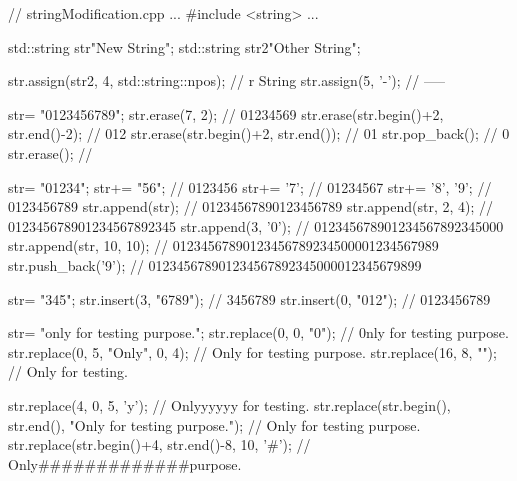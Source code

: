 
\begin{cpp}
// stringModification.cpp
...
#include <string>
...

std::string str{"New String"};
std::string str2{"Other String"};

str.assign(str2, 4, std::string::npos); // r String
str.assign(5, '-'); // -----

str= {"0123456789"};
str.erase(7, 2); // 01234569
str.erase(str.begin()+2, str.end()-2); // 012
str.erase(str.begin()+2, str.end()); // 01
str.pop_back(); // 0
str.erase(); //

str= "01234";
str+= "56"; // 0123456
str+= '7'; // 01234567
str+= {'8', '9'}; // 0123456789
str.append(str); // 01234567890123456789
str.append(str, 2, 4); // 012345678901234567892345
str.append(3, '0'); // 012345678901234567892345000
str.append(str, 10, 10); // 01234567890123456789234500001234567989
str.push_back('9'); // 012345678901234567892345000012345679899

str= {"345"};
str.insert(3, "6789"); // 3456789
str.insert(0, "012"); // 0123456789

str= {"only for testing purpose."};
str.replace(0, 0, "0"); // 0nly for testing purpose.
str.replace(0, 5, "Only", 0, 4); // Only for testing purpose.
str.replace(16, 8, ""); // Only for testing.

str.replace(4, 0, 5, 'y'); // Onlyyyyyy for testing.
str.replace(str.begin(), str.end(), "Only for testing purpose.");
										// Only for testing purpose.
str.replace(str.begin()+4, str.end()-8, 10, '#');
										// Only#############purpose.
\end{cpp}











































